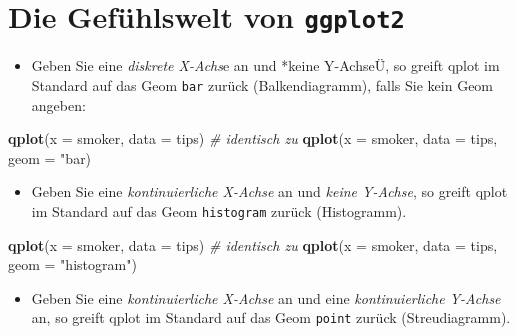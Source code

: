 \documentclass[12pt,ngerman,]{book}
\makeatletter
\newenvironment{Shaded}{\begin{snugshade}}{\end{snugshade}}
\newcommand{\KeywordTok}[1]{\textcolor[rgb]{0.13,0.29,0.53}{\textbf{{#1}}}}
\newcommand{\DataTypeTok}[1]{\textcolor[rgb]{0.13,0.29,0.53}{{#1}}}
\newcommand{\StringTok}[1]{\textcolor[rgb]{0.31,0.60,0.02}{{#1}}}
\newcommand{\CommentTok}[1]{\textcolor[rgb]{0.56,0.35,0.01}{\textit{{#1}}}}
\newcommand{\NormalTok}[1]{{#1}}
\providecommand{\tightlist}{%
  \setlength{\itemsep}{0pt}\setlength{\parskip}{0pt}}
\newenvironment{kframe}{%
\medskip{}
\setlength{\fboxsep}{.8em}
 \def\at@end@of@kframe{}%
 \ifinner\ifhmode%
  \def\at@end@of@kframe{\end{minipage}}%
  \begin{minipage}{\columnwidth}%
 \fi\fi%
 \def\FrameCommand##1{\hskip\@totalleftmargin \hskip-\fboxsep
 \colorbox{shadecolor}{##1}\hskip-\fboxsep
     \hskip-\linewidth \hskip-\@totalleftmargin \hskip\columnwidth}%
 \MakeFramed {\advance\hsize-\width
   \@totalleftmargin\z@ \linewidth\hsize
   \@setminipage}}%
 {\par\unskip\endMakeFramed%
 \at@end@of@kframe}
\renewenvironment{Shaded}{\begin{kframe}}{\end{kframe}}
\makeatother
\begin{document}
\section{\texorpdfstring{Die Gefühlswelt von
\texttt{ggplot2}}{Die Gefühlswelt von ggplot2}}\label{die-gefuhlswelt-von-ggplot2}

\begin{itemize}
\tightlist
\item
  Geben Sie eine \emph{diskrete X-Achs}e an und *keine Y-AchseÜ, so
  greift qplot im Standard auf das Geom \texttt{bar} zurück
  (Balkendiagramm), falls Sie kein Geom angeben:
\end{itemize}

\begin{Shaded}
\begin{Highlighting}[]
\KeywordTok{qplot}\NormalTok{(}\DataTypeTok{x =} \NormalTok{smoker, }\DataTypeTok{data =} \NormalTok{tips)  }\CommentTok{# identisch zu}
\KeywordTok{qplot}\NormalTok{(}\DataTypeTok{x =} \NormalTok{smoker, }\DataTypeTok{data =} \NormalTok{tips, }\DataTypeTok{geom =} \StringTok{"bar)}
\end{Highlighting}
\end{Shaded}

\begin{itemize}
\tightlist
\item
  Geben Sie eine \emph{kontinuierliche X-Achse} an und \emph{keine
  Y-Achse}, so greift qplot im Standard auf das Geom \texttt{histogram}
  zurück (Histogramm).
\end{itemize}

\begin{Shaded}
\begin{Highlighting}[]
\KeywordTok{qplot}\NormalTok{(}\DataTypeTok{x =} \NormalTok{smoker, }\DataTypeTok{data =} \NormalTok{tips)  }\CommentTok{# identisch zu}
\KeywordTok{qplot}\NormalTok{(}\DataTypeTok{x =} \NormalTok{smoker, }\DataTypeTok{data =} \NormalTok{tips, }\DataTypeTok{geom =} \StringTok{"histogram"}\NormalTok{)}
\end{Highlighting}
\end{Shaded}

\begin{itemize}
\tightlist
\item
  Geben Sie eine \emph{kontinuierliche X-Achse} an und eine
  \emph{kontinuierliche Y-Achse} an, so greift qplot im Standard auf das
  Geom \texttt{point} zurück (Streudiagramm).
\end{itemize}
\end{document}
